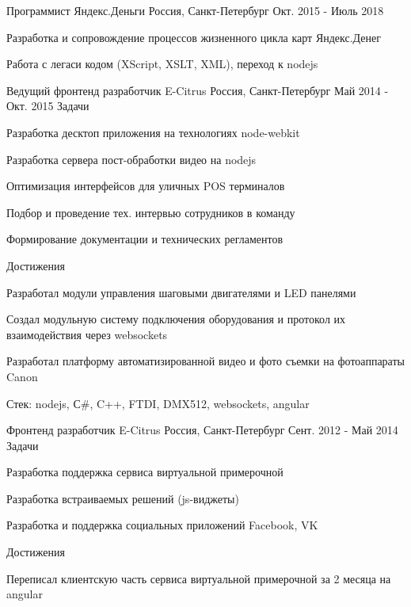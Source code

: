 \begin{cventries}
  \cventry
    {Программист}
    {Яндекс.Деньги}
    {Россия, Санкт-Петербург}
    {Окт. 2015 - Июль 2018}
    {
      \begin{cvitems}
        \item {Разработка и сопровождение процессов жизненного цикла карт Яндекс.Денег}
        \item {Работа с легаси кодом (XScript, XSLT, XML), переход к nodejs}
      \end{cvitems}
    }

  \cvmultientry
    {Ведущий фронтенд разработчик}
    {E-Citrus}
    {Россия, Санкт-Петербург}
    {Май 2014 - Окт. 2015}
    {Задачи}
    {
      \begin{cvitems}
        \item {Разработка десктоп приложения на технологиях node-webkit}
        \item {Разработка сервера пост-обработки видео на nodejs}
        \item {Оптимизация интерфейсов для уличных POS терминалов}
        \item {Подбор и проведение тех. интервью сотрудников в команду}
        \item {Формирование документации и технических регламентов}
      \end{cvitems}
    }
    {Достижения}
    {
      \begin{cvitems}
        \item {Разработал модули управления шаговыми двигателями и LED панелями}
        \item {Создал модульную систему подключения оборудования и протокол их взаимодействия через websockets}
        \item {Разработал платформу автоматизированной видео и фото съемки на фотоаппараты Canon}
      \end{cvitems}
    }

    \begin{cvskills}
      \cvskill
        {Стек:}
        {nodejs, С\#, C++, FTDI, DMX512, websockets, angular}
    \end{cvskills}

  \cvmultientry
    {Фронтенд разработчик}
    {E-Citrus}
    {Россия, Санкт-Петербург}
    {Сент. 2012 - Май 2014}
    {Задачи}
    {
      \begin{cvitems}
        \item {Разработка поддержка сервиса виртуальной примерочной}
        \item {Разработка встраиваемых решений (js-виджеты)}
        \item {Разработка и поддержка социальных приложений Facebook, VK}
      \end{cvitems}
    }
    {Достижения}
    {
      \begin{cvitems}
        \item {Переписал клиентскую часть сервиса виртуальной примерочной за 2 месяца на angular}
      \end{cvitems}
    }


\end{cventries}
